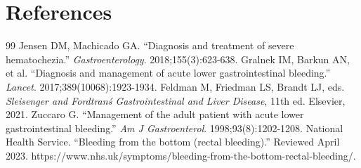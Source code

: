 \section*{References}
\begin{thebibliography}{99}
 Jensen DM, Machicado GA. ``Diagnosis and treatment of severe hematochezia.'' \textit{Gastroenterology}. 2018;155(3):623-638.
 Gralnek IM, Barkun AN, et al. ``Diagnosis and management of acute lower gastrointestinal bleeding.'' \textit{Lancet}. 2017;389(10068):1923-1934.
 Feldman M, Friedman LS, Brandt LJ, eds. \textit{Sleisenger and Fordtran\'s Gastrointestinal and Liver Disease}, 11th ed. Elsevier, 2021.
 Zuccaro G. ``Management of the adult patient with acute lower gastrointestinal bleeding.'' \textit{Am J Gastroenterol}. 1998;93(8):1202-1208.
 National Health Service. ``Bleeding from the bottom (rectal bleeding).'' Reviewed April 2023. https://www.nhs.uk/symptoms/bleeding-from-the-bottom-rectal-bleeding/.
\end{thebibliography}
